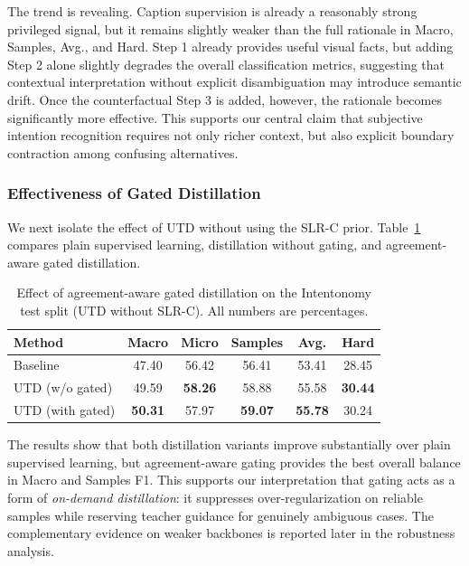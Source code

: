 The trend is revealing. Caption supervision is already a reasonably strong privileged signal, but it remains slightly weaker than the full rationale in Macro, Samples, Avg., and Hard. Step 1 already provides useful visual facts, but adding Step 2 alone slightly degrades the overall classification metrics, suggesting that contextual interpretation without explicit disambiguation may introduce semantic drift. Once the counterfactual Step 3 is added, however, the rationale becomes significantly more effective. This supports our central claim that subjective intention recognition requires not only richer context, but also explicit boundary contraction among confusing alternatives.

\subsubsection{Effectiveness of Gated Distillation}

We next isolate the effect of UTD without using the SLR-C prior. Table~\ref{tab:distill_ablation} compares plain supervised learning, distillation without gating, and agreement-aware gated distillation.
\begin{table}[t]
\centering
\caption{Effect of agreement-aware gated distillation on the Intentonomy test split (UTD without SLR-C). All numbers are percentages.}
\label{tab:distill_ablation}
\begin{tabular}{lccccc}
\hline
Method & Macro & Micro & Samples & Avg. & Hard \\
\hline
Baseline & 47.40 & 56.42 & 56.41 & 53.41 & 28.45 \\
UTD (w/o gated) & 49.59 & \textbf{58.26} & 58.88 & 55.58 & \textbf{30.44} \\
UTD (with gated) & \textbf{50.31} & 57.97 & \textbf{59.07} & \textbf{55.78} & 30.24 \\
\hline
\end{tabular}
\end{table}

The results show that both distillation variants improve substantially over plain supervised learning, but agreement-aware gating provides the best overall balance in Macro and Samples F1. This supports our interpretation that gating acts as a form of \emph{on-demand distillation}: it suppresses over-regularization on reliable samples while reserving teacher guidance for genuinely ambiguous cases. The complementary evidence on weaker backbones is reported later in the robustness analysis.

